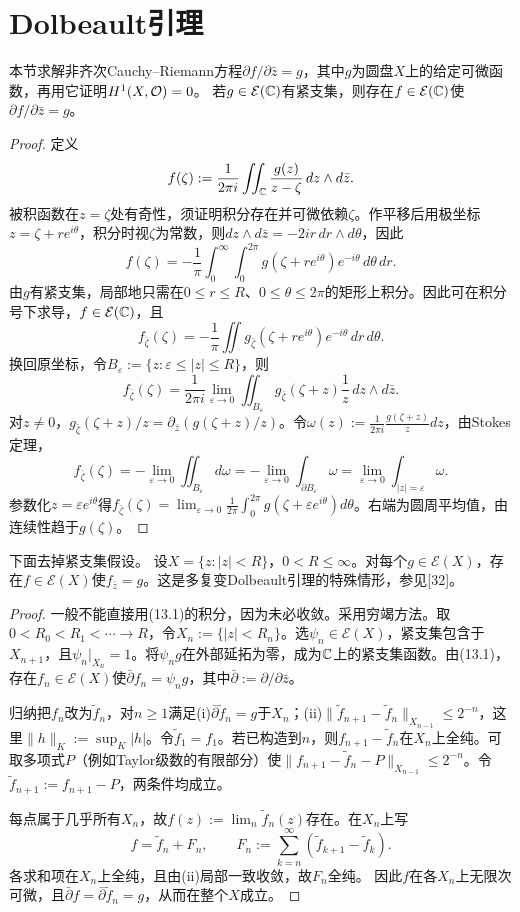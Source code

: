 \section{Dolbeault引理}
本节求解非齐次Cauchy--Riemann方程$\partial f/\partial\bar z=g$，其中$g$为圆盘$X$上的给定可微函数，再用它证明$H^1(X,\mathcal O)=0$。
若$g\in\mathcal E(\mathbb C)$有紧支集，则存在$f\in\mathcal E(\mathbb C)$使$\partial f/\partial\bar z=g$。
\begin{proof}
定义
\[
f(\zeta):=\frac1{2\pi i}\iint_\mathbb C\frac{g(z)}{z-\zeta}\,dz\wedge d\bar z.
\]
被积函数在$z=\zeta$处有奇性，须证明积分存在并可微依赖$\zeta$。作平移后用极坐标$z=\zeta+re^{i\theta}$，积分时视$\zeta$为常数，则$dz\wedge d\bar z=-2ir\,dr\wedge d\theta$，因此
\[
f(\zeta)=-\frac1\pi\int_0^\infty\int_0^{2\pi}g(\zeta+re^{i\theta})e^{-i\theta}\,d\theta\,dr.
\]
由$g$有紧支集，局部地只需在$0\le r\le R$、$0\le\theta\le2\pi$的矩形上积分。因此可在积分号下求导，$f\in\mathcal E(\mathbb C)$，且
\[
f_{\bar\zeta}(\zeta)=-\frac1\pi\iint g_{\bar\zeta}(\zeta+re^{i\theta})e^{-i\theta}\,dr\,d\theta.
\]
换回原坐标，令$B_\varepsilon:=\{z:\varepsilon\le|z|\le R\}$，则
\[
f_{\bar\zeta}(\zeta)=\frac1{2\pi i}\lim_{\varepsilon\to0}\iint_{B_\varepsilon}g_{\bar\zeta}(\zeta+z)\frac1z\,dz\wedge d\bar z.
\]
对$z\ne0$，$g_{\bar\zeta}(\zeta+z)/z=\partial_{\bar z}(g(\zeta+z)/z)$。令$\omega(z):=\frac1{2\pi i}\frac{g(\zeta+z)}z dz$，由Stokes定理，
\[
f_{\bar\zeta}(\zeta)=-\lim_{\varepsilon\to0}\iint_{B_\varepsilon}d\omega
=-\lim_{\varepsilon\to0}\int_{\partial B_\varepsilon}\omega
=\lim_{\varepsilon\to0}\int_{|z|=\varepsilon}\omega.
\]
参数化$z=\varepsilon e^{i\theta}$得$f_{\bar\zeta}(\zeta)=\lim_{\varepsilon\to0}\frac1{2\pi}\int_0^{2\pi}g(\zeta+\varepsilon e^{i\theta})d\theta$。右端为圆周平均值，由连续性趋于$g(\zeta)$。
\end{proof}
下面去掉紧支集假设。
设$X=\{z:|z|<R\}$，$0<R\le\infty$。对每个$g\in\mathcal E(X)$，存在$f\in\mathcal E(X)$使$f_{\bar z}=g$。这是多复变Dolbeault引理的特殊情形，参见[32]。
\begin{proof}
一般不能直接用(13.1)的积分，因为未必收敛。采用穷竭方法。取$0<R_0<R_1<\cdots\to R$，令$X_n:=\{|z|<R_n\}$。选$\psi_n\in\mathcal E(X)$，紧支集包含于$X_{n+1}$，且$\psi_n|_{X_n}=1$。将$\psi_ng$在外部延拓为零，成为$\mathbb C$上的紧支集函数。由(13.1)，存在$f_n\in\mathcal E(X)$使$\bar\partial f_n=\psi_ng$，其中$\bar\partial:=\partial/\partial\bar z$。

归纳把$f_n$改为$\widetilde f_n$，对$n\ge1$满足(i)$\bar\partial\widetilde f_n=g$于$X_n$；(ii)$\|\widetilde f_{n+1}-\widetilde f_n\|_{X_{n-1}}\le2^{-n}$，这里$\|h\|_K:=\sup_K|h|$。令$\widetilde f_1=f_1$。若已构造到$n$，则$f_{n+1}-\widetilde f_n$在$X_n$上全纯。可取多项式$P$（例如Taylor级数的有限部分）使$\|f_{n+1}-\widetilde f_n-P\|_{X_{n-1}}\le2^{-n}$。令$\widetilde f_{n+1}:=f_{n+1}-P$，两条件均成立。

每点属于几乎所有$X_n$，故$f(z):=\lim_n\widetilde f_n(z)$存在。在$X_n$上写
\[
f=\widetilde f_n+F_n,\qquad F_n:=\sum_{k=n}^\infty(\widetilde f_{k+1}-\widetilde f_k).
\]
各求和项在$X_n$上全纯，且由(ii)局部一致收敛，故$F_n$全纯。
因此$f$在各$X_n$上无限次可微，且$\bar\partial f=\bar\partial\widetilde f_n=g$，从而在整个$X$成立。
\end{proof}
